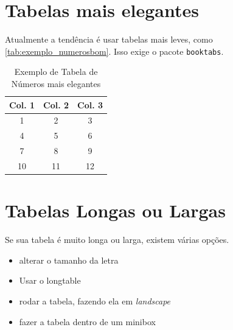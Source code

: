 \documentclass[dsc,setavermelha]{ufrj}
\theoremstyle{plain}
\theoremstyle{definition}
\theoremstyle{remark}
\begin{document}
\begin{mapa}[ht]
\centering
\caption{Segundo mapa, para provar o contador e a lista}
\label{mapa:segundo}
\end{mapa}

\section{Tabelas mais elegantes}

Atualmente a tendência é usar tabelas mais leves, como \autoref{tab:exemplo_numerosbom}. Isso exige o pacote \verb*|booktabs|.

\begin{table}[ht]
\centering %
\caption{Exemplo de Tabela de Números mais elegantes}
\label{tab:exemplo_numerosbom}
\begin{tabular}{ccc} %
\toprule %
\textbf{Col. 1} & \textbf{Col. 2} & \textbf{Col. 3} \\ %
\midrule %
1 & 2 & 3 \\ %
4 & 5 & 6 \\ %
7 & 8 & 9 \\ %
10 & 11 & 12 \\ %
\bottomrule %
\end{tabular}
\end{table}

\section{Tabelas Longas ou Largas}

Se sua tabela é muito longa ou larga, existem várias opções.
\begin{itemize}
    \item alterar o tamanho da letra
    \item Usar o longtable
    \item rodar a tabela, fazendo ela em \textit{landscape}
    \item fazer a tabela dentro de um minibox
\end{itemize}
\end{document}

